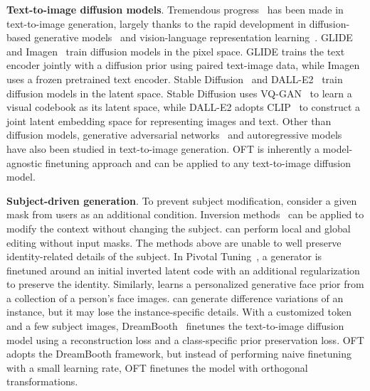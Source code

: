 \documentclass{article}
\begin{document}
\textbf{Text-to-image diffusion models}. Tremendous progress~\cite{saharia2022photorealistic,ramesh2022hierarchical,rombach2022high,gu2022vector,nichol2022glide} has been made in text-to-image generation, largely thanks to the rapid development in diffusion-based generative models~\cite{ho2020denoising,song2021score,song2021denoising,dhariwal2021diffusion} and vision-language representation learning~\cite{su2020vlbert,lu2019vilbert,radford2021learning,wang2021simvlm,li2022blip,li2023blip,alayrac2022flamingo,schuhmann2022laion}. GLIDE~\cite{nichol2022glide} and Imagen~\cite{saharia2022photorealistic} train diffusion models in the pixel space. GLIDE trains the text encoder jointly with a diffusion prior using paired text-image data, while Imagen uses a frozen pretrained text encoder. Stable Diffusion~\cite{rombach2022high} and DALL-E2~\cite{ramesh2022hierarchical} train diffusion models in the latent space. Stable Diffusion uses VQ-GAN~\cite{esser2021taming} to learn a visual codebook as its latent space, while DALL-E2 adopts CLIP~\cite{radford2021learning} to construct a joint latent embedding space for representing images and text. Other than diffusion models, generative adversarial networks~\cite{reed2016generative,zhang2017stackgan,xu2018attngan,li2019controllable} and autoregressive models~\cite{ramesh2021zero,ding2021cogview,wu2022nuwa,yuscaling} have also been studied in text-to-image generation. OFT is inherently a model-agnostic finetuning approach and can be applied to any text-to-image diffusion model.



\textbf{Subject-driven generation}. To prevent subject modification, \cite{avrahami2022blended,nichol2022glide} consider a given mask from users as an additional condition. Inversion methods~\cite{choi2021ilvr,dhariwal2021diffusion,ramesh2022hierarchical,gal2022image} can be applied to modify the context without changing the subject. \cite{hertz2022prompt} can perform local and global editing without input masks. The methods above are unable to well preserve identity-related details of the subject. In Pivotal Tuning~\cite{roich2022pivotal}, a generator is finetuned around an initial inverted latent code with an additional regularization to preserve the identity. Similarly, \cite{nitzan2022mystyle} learns a personalized generative face prior from a collection of a person's face images. \cite{casanova2021instance} can generate difference variations of an instance, but it may lose the instance-specific details. With a customized token and a few subject images, DreamBooth~\cite{ruiz2023dreambooth} finetunes the text-to-image diffusion model using a reconstruction loss and a class-specific prior preservation loss. OFT adopts the DreamBooth framework, but instead of performing naive finetuning with a small learning rate, OFT finetunes the model with orthogonal transformations.
\end{document}
